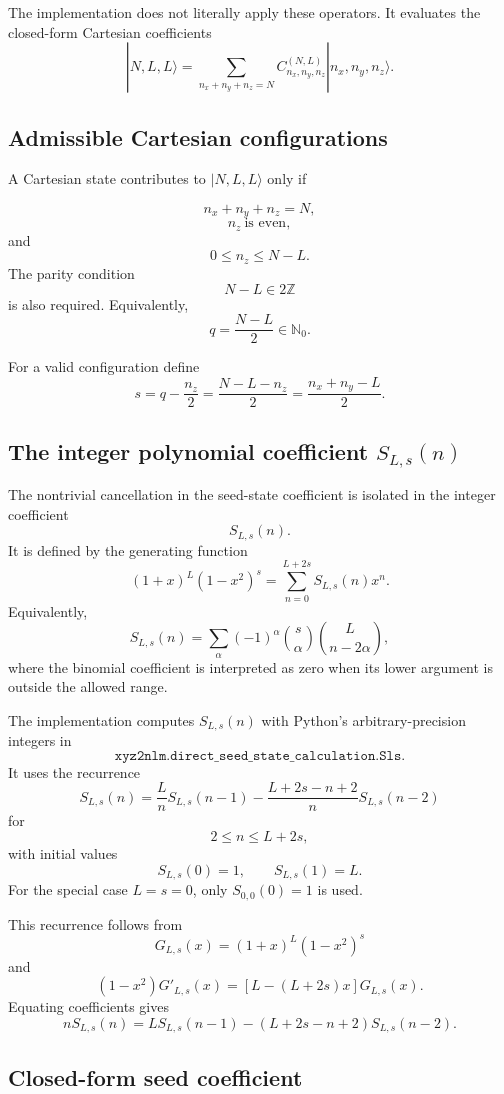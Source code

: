 \documentclass[11pt]{article}
\begin{document}
The implementation does not literally apply these operators. It evaluates
the closed-form Cartesian coefficients
\[
    |N,L,L\rangle
    =
    \sum_{n_x+n_y+n_z=N}
    C^{(N,L)}_{n_x,n_y,n_z}
    |n_x,n_y,n_z\rangle .
\]

\subsection{Admissible Cartesian configurations}

A Cartesian state contributes to \(|N,L,L\rangle\) only if

\[
    n_x+n_y+n_z=N,
\]
\[
    n_z\ \text{is even},
\]
and
\[
    0\le n_z\le N-L .
\]
The parity condition
\[
    N-L\in 2\mathbb Z
\]
is also required. Equivalently,
\[
    q=\frac{N-L}{2}\in\mathbb N_0 .
\]

For a valid configuration define
\[
    s=q-\frac{n_z}{2}
    =
    \frac{N-L-n_z}{2}
    =
    \frac{n_x+n_y-L}{2}.
\]

\subsection{The integer polynomial coefficient \(S_{L,s}(n)\)}

The nontrivial cancellation in the seed-state coefficient is isolated in the
integer coefficient
\[
    S_{L,s}(n).
\]
It is defined by the generating function
\[
    (1+x)^L(1-x^2)^s
    =
    \sum_{n=0}^{L+2s}
    S_{L,s}(n)x^n .
\]
Equivalently,
\[
    S_{L,s}(n)
    =
    \sum_{\alpha}
    (-1)^\alpha
    \binom{s}{\alpha}
    \binom{L}{n-2\alpha},
\]
where the binomial coefficient is interpreted as zero when its lower
argument is outside the allowed range.

The implementation computes \(S_{L,s}(n)\) with Python's arbitrary-precision
integers in
\[
    \texttt{xyz2nlm.direct\_seed\_state\_calculation.Sls}.
\]
It uses the recurrence
\[
    \boxed{
    S_{L,s}(n)
    =
    \frac{L}{n}S_{L,s}(n-1)
    -
    \frac{L+2s-n+2}{n}S_{L,s}(n-2)
    }
\]
for
\[
    2\le n\le L+2s,
\]
with initial values
\[
    S_{L,s}(0)=1,
    \qquad
    S_{L,s}(1)=L.
\]
For the special case \(L=s=0\), only \(S_{0,0}(0)=1\) is used.

This recurrence follows from
\[
    G_{L,s}(x)=(1+x)^L(1-x^2)^s
\]
and
\[
    (1-x^2)G'_{L,s}(x)
    =
    \left[L-(L+2s)x\right]G_{L,s}(x).
\]
Equating coefficients gives
\[
    nS_{L,s}(n)
    =
    L S_{L,s}(n-1)
    -
    (L+2s-n+2)S_{L,s}(n-2).
\]

\subsection{Closed-form seed coefficient}
\end{document}

